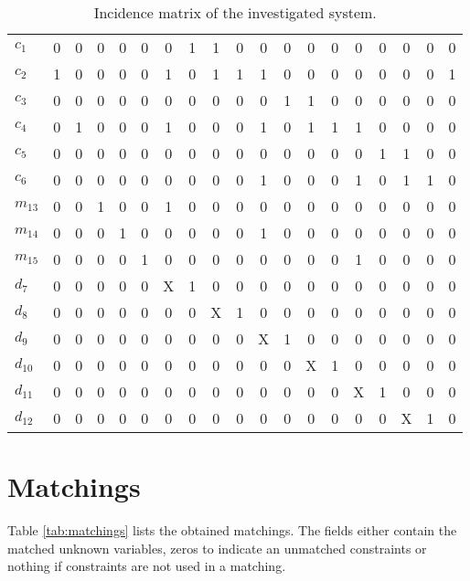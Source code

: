 \documentclass[a4,11pt]{article}
\begin{document}
\begin{table}[!htb]
\begin{tabular}{|l|ccccc|ccccccccccccc|}
\hline
$c_1$  & 0 & 0 & 0 & 0 & 0 & 0 & 1 & 1 & 0 & 0 & 0 & 0 & 0 & 0 & 0 & 0 & 0 & 0 \\ 
$c_2$  & 1 & 0 & 0 & 0 & 0 & 1 & 0 & 1 & 1 & 1 & 0 & 0 & 0 & 0 & 0 & 0 & 0 & 1 \\ 
$c_3$  & 0 & 0 & 0 & 0 & 0 & 0 & 0 & 0 & 0 & 0 & 1 & 1 & 0 & 0 & 0 & 0 & 0 & 0 \\ 
$c_4$  & 0 & 1 & 0 & 0 & 0 & 1 & 0 & 0 & 0 & 1 & 0 & 1 & 1 & 1 & 0 & 0 & 0 & 0 \\ 
$c_5$  & 0 & 0 & 0 & 0 & 0 & 0 & 0 & 0 & 0 & 0 & 0 & 0 & 0 & 0 & 1 & 1 & 0 & 0 \\ 
$c_6$  & 0 & 0 & 0 & 0 & 0 & 0 & 0 & 0 & 0 & 1 & 0 & 0 & 0 & 1 & 0 & 1 & 1 & 0 \\ 
$m_{13}$  & 0 & 0 & 1 & 0 & 0 & 1 & 0 & 0 & 0 & 0 & 0 & 0 & 0 & 0 & 0 & 0 & 0 & 0 \\ 
$m_{14}$  & 0 & 0 & 0 & 1 & 0 & 0 & 0 & 0 & 0 & 1 & 0 & 0 & 0 & 0 & 0 & 0 & 0 & 0 \\ 
$m_{15}$  & 0 & 0 & 0 & 0 & 1 & 0 & 0 & 0 & 0 & 0 & 0 & 0 & 0 & 1 & 0 & 0 & 0 & 0 \\ 
\hline
$d_7$  & 0 & 0 & 0 & 0 & 0 & X & 1 & 0 & 0 & 0 & 0 & 0 & 0 & 0 & 0 & 0 & 0 & 0 \\ 
$d_8$  & 0 & 0 & 0 & 0 & 0 & 0 & 0 & X & 1 & 0 & 0 & 0 & 0 & 0 & 0 & 0 & 0 & 0 \\ 
$d_9$  & 0 & 0 & 0 & 0 & 0 & 0 & 0 & 0 & 0 & X & 1 & 0 & 0 & 0 & 0 & 0 & 0 & 0 \\ 
$d_{10}$  & 0 & 0 & 0 & 0 & 0 & 0 & 0 & 0 & 0 & 0 & 0 & X & 1 & 0 & 0 & 0 & 0 & 0 \\ 
$d_{11}$  & 0 & 0 & 0 & 0 & 0 & 0 & 0 & 0 & 0 & 0 & 0 & 0 & 0 & X & 1 & 0 & 0 & 0 \\ 
$d_{12}$  & 0 & 0 & 0 & 0 & 0 & 0 & 0 & 0 & 0 & 0 & 0 & 0 & 0 & 0 & 0 & X & 1 & 0 \\ \hline
\end{tabular}
\caption{Incidence matrix of the investigated system.}
\label{tab:matrix}
\end{table}
\newpage
\section{Matchings}
Table \ref{tab:matchings} lists the obtained matchings. The fields either contain the matched unknown variables, zeros to indicate an unmatched constraints or nothing if constraints are not used in a matching.\setlength\tabcolsep{2mm}
\end{document}
